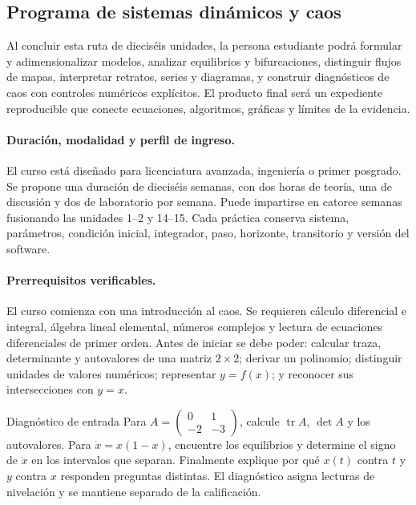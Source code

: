 
\subsection*{Programa de sistemas dinámicos y caos}
{}

\begin{objectivebox}
Al concluir esta ruta de dieciséis unidades, la persona estudiante podrá formular y
adimensionalizar modelos, analizar equilibrios y bifurcaciones, distinguir flujos de
mapas, interpretar retratos, series y diagramas, y construir diagnósticos de caos con
controles numéricos explícitos. El producto final será un expediente reproducible que
conecte ecuaciones, algoritmos, gráficas y límites
de la evidencia.
\end{objectivebox}

\paragraph{Duración, modalidad y perfil de ingreso.}
El curso está diseñado para licenciatura avanzada, ingeniería o primer posgrado. Se
propone una duración de dieciséis semanas, con dos horas de teoría, una de discusión y
dos de laboratorio por semana. Puede impartirse en catorce semanas fusionando las
unidades 1--2 y 14--15. Cada práctica conserva sistema, parámetros, condición inicial,
integrador, paso, horizonte, transitorio y versión del software.

\paragraph{Prerrequisitos verificables.}
El curso comienza con una introducción al caos. Se requieren cálculo diferencial e integral,
álgebra lineal elemental, números complejos y lectura de ecuaciones diferenciales de
primer orden. Antes de iniciar se debe poder: calcular traza, determinante y
autovalores de una matriz \(2\times2\); derivar un polinomio; distinguir unidades de
valores numéricos; representar \(y=f(x)\); y reconocer sus intersecciones con \(y=x\).

\begin{activitybox}{Diagnóstico de entrada}
Para \(A=\left(\begin{smallmatrix}0&1\\-2&-3\end{smallmatrix}\right)\), calcule
\(\operatorname{tr}A\), \(\det A\) y los autovalores. Para
\(\dot x=x(1-x)\), encuentre los equilibrios y determine el signo de \(\dot x\) en
los intervalos que separan. Finalmente explique por qué \(x(t)\) contra \(t\) y
\(y\) contra \(x\) responden preguntas distintas. El diagnóstico asigna lecturas de
nivelación y se mantiene separado de la calificación.
\end{activitybox}

